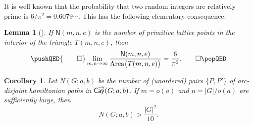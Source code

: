 \documentclass[11pt]{amsart}
\newtheorem{lem}[equation]{Lemma}
\newtheorem{cor}[equation]{Corollary}
\theoremstyle{definition}
\numberwithin{case}{startcases}
\numberwithin{equation}{section}
\DeclareMathOperator{\Area}{Area}
\newcommand{\cayd}{\mathop{\mathsf{C}\mkern-1mu\overrightarrow{\mathsf{ay}}}}
\begin{document}
	It is well known \cite[Thm.~459, p.~541]{HardyWright} that the probability that two random integers are relatively prime is $6/\pi^2 = 0.6079\cdots$. This has the following elementary consequence:
	
	\begin{lem}[{\cite[Thm.~8.5]{Curran}}] \label{TriangleAsympCount}
		If\/ $\mathsf N(m,n,e)$ is the number of primitive lattice points in the interior of the triangle $T(m,n,e)$, then
		\[ 
		\pushQED{\qed}
		\lim_{m,n \to \infty} \frac{\mathsf  N(m,n,e)}{\Area \bigl( T(m,n,e) \bigr)} = \frac{6}{\pi^2} . 
		\qedhere
		\popQED \]
	\end{lem}
	
	\begin{cor} \label{manyHP}
		Let $N(G; a, b)$ be the number of \textup(unordered\textup) pairs $\{P, P'\}$ of arc-disjoint hamiltonian paths in $\cayd(G; a,b)$. If $m = o(a)$ and $n = |G|/o(a)$ are sufficiently large, then
		\[ N(G; a, b) > \frac{|G|^2}{10} . \]
	\end{cor}
	
\end{document}
